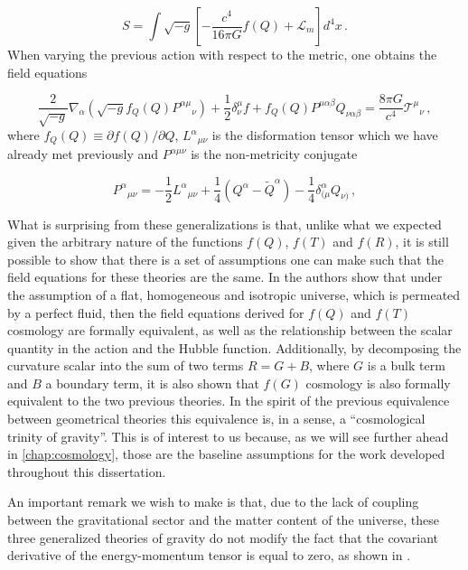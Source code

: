 \begin{equation}
    \label{eq:f(Q)-action}
    S = \int \sqrt{-g} \left[ -\frac{c^4}{16 \pi G} f(Q) + \mathcal{L}_m \right] d^4x \,.
\end{equation}
When varying the previous action with respect to the metric, one obtains the field equations \cite{Jimenez2019}

\begin{equation}
    \label{eq:f(Q)-field-equations}
    \frac{2}{\sqrt{-g}} \nabla_\alpha \left( \sqrt{-g} f_{Q}(Q) P^{\alpha\mu}{}_\nu \right)
    +  \frac{1}{2} \delta^\mu_\nu f
    +  f_{Q}(Q) P^{\mu\alpha\beta} Q_{\nu\alpha\beta}
    =  \frac{8 \pi G}{c^4} \mathcal{T}^\mu{}_\nu \,,
\end{equation}
where $f_Q(Q) \equiv \partial f(Q) / \partial Q$, $L^\alpha{}_{\mu \nu}$ is the disformation tensor which we have already met previously and $P^{\alpha \mu \nu}$ is the non-metricity conjugate

\begin{equation}
    P^\alpha{}_{\mu \nu} = - \frac{1}{2} L^\alpha{}_{\mu \nu} + \frac{1}{4} (Q^\alpha - \tilde{Q}^\alpha) - \frac{1}{4} \delta^\alpha_{(\mu} Q_{\nu)} \,,
\end{equation}

What is surprising from these generalizations is that, unlike what we expected given the arbitrary nature of the functions $f(Q)$, $f(T)$ and $f(R)$, it is still possible to show that there is a set of assumptions one can make such that the field equations for these theories are the same. In \cite{Boehmer2021} the authors show that under the assumption of a flat, homogeneous and isotropic universe, which is permeated by a perfect fluid, then the field equations derived for $f(Q)$ and $f(T)$ cosmology are formally equivalent, as well as the relationship between the scalar quantity in the action and the Hubble function. Additionally, by decomposing the curvature scalar into the sum of two terms $R = G + B$, where $G$ is a bulk term and $B$ a boundary term, it is also shown that $f(G)$ cosmology is also formally equivalent to the two previous theories. In the spirit of the previous equivalence between geometrical theories this equivalence is, in a sense, a ``cosmological trinity of gravity''. This is of interest to us because, as we will see further ahead in \cref{chap:cosmology}, those are the baseline assumptions for the work developed throughout this dissertation.

An important remark we wish to make is that, due to the lack of coupling between the gravitational sector and the matter content of the universe, these three generalized theories of gravity do not modify the fact that the covariant derivative of the energy-momentum tensor is equal to zero, as shown in \cite{Koivisto2005}.

